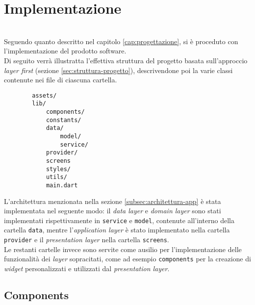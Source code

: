 \chapter{Implementazione}
\label{cap:implementazione}

\\

Seguendo quanto descritto nel capitolo \ref{cap:progettazione}, si è proceduto con l'implementazione del prodotto software.\\
Di seguito verrà illustratta l'effettiva struttura del progetto basata sull'approccio \emph{layer first} (sezione \ref{sec:struttura-progetto}), descrivendone poi la varie classi contenute nei file di ciascuna cartella. \\

\begin{center}
    \begin{verbatim}
        assets/
        lib/
            components/
            constants/
            data/
                model/
                service/
            provider/
            screens
            styles/
            utils/
            main.dart
    \end{verbatim}
\end{center}

L'architettura menzionata nella sezione \ref{subsec:architettura-app} è stata implementata nel seguente modo: il \emph{data layer} e \emph{domain layer} sono stati implementati rispettivamente in \lstinline{service} e \lstinline{model}, contenute all'interno della cartella \lstinline{data}, mentre l'\emph{application layer} è stato implementato nella cartella \lstinline{provider} e il \emph{presentation layer} nella cartella \lstinline{screens}.\\
Le restanti cartelle invece sono servite come ausilio per l'implementazione delle funzionalità dei \emph{layer} sopracitati, come ad esempio \lstinline{components} per la creazione di \emph{widget} personalizzati e utilizzati dal \emph{presentation layer}.

\section{Components}
\label{sec:components}


